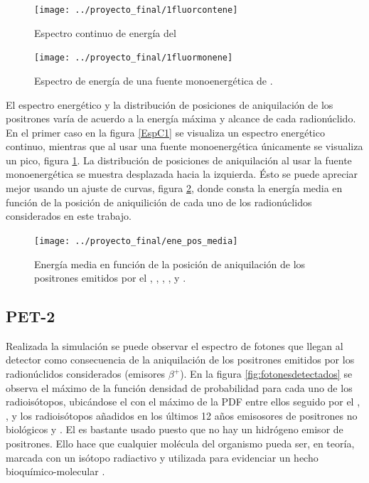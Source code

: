 \documentclass[12pt,a4paper,onecolumn]{article}
\begin{document}
\begin{figure}[H]
\centering
  \begin{minipage}{0.45\textwidth}
	\centering
    \texttt{[image: ../proyecto\_final/1fluorcontene]}
    \caption{Espectro continuo de energía del }
    \label{EspC1}
  \end{minipage}
  \hspace{2mm}
  \begin{minipage}{0.45\textwidth}
	\centering
	\texttt{[image: ../proyecto\_final/1fluormonene]}
	\caption{Espectro de energía de una fuente monoenergética de .}
	\label{fig:1fluormonene}
  \end{minipage}	
\end{figure}
El espectro energético y la distribución de posiciones de aniquilación de los positrones varía de acuerdo a la energía máxima y alcance de cada radionúclido. En el primer caso en la figura \ref{EspC1} se visualiza un espectro energético continuo, mientras que al usar una fuente monoenergética únicamente se visualiza un pico, figura \ref{fig:1fluormonene}. La distribución de posiciones de aniquilación al usar la fuente monoenergética se muestra desplazada hacia la izquierda. Ésto se puede apreciar mejor usando un ajuste de curvas, figura \ref{fig:eneposmedia}, donde consta la energía media en función de la posición de aniquilición de cada uno de los radionúclidos considerados en este trabajo. 
\begin{figure}[h]
	\centering
	\texttt{[image: ../proyecto\_final/ene\_pos\_media]}
	\caption{Energía media en función de la posición de aniquilación de los positrones emitidos por el , , , ,  y .}
	\label{fig:eneposmedia}
\end{figure}
\subsection*{PET-2} 
Realizada la simulación se puede observar el espectro de fotones que llegan al detector como consecuencia de la aniquilación de los positrones emitidos por los radionúclidos considerados (emisores $\beta^+$). En la figura \ref{fig:fotonesdetectados} se observa el máximo de la función densidad de probabilidad para cada uno de los radioisótopos, ubicándose el  con el máximo de la PDF entre ellos seguido por el , ,  y los radioisótopos añadidos en los últimos 12 años emisosores de positrones no biológicos  y . El  es bastante usado puesto que no hay un hidrógeno emisor de positrones. Ello hace que cualquier molécula del organismo pueda ser, en teoría, marcada con un isótopo radiactivo y utilizada para evidenciar un hecho bioquímico-molecular \cite{sanchez2006}. 
\end{document}
